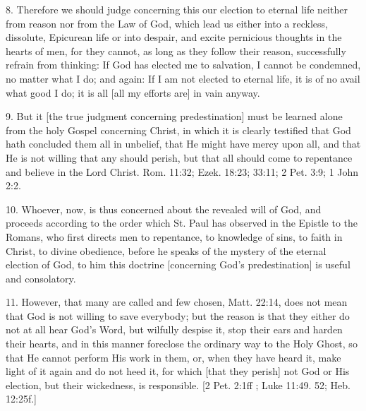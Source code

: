 8. Therefore we should judge concerning this our election to eternal life neither from reason nor from the Law of God, which lead us either into a reckless, dissolute, Epicurean life or into despair, and excite pernicious thoughts in the hearts of men, for they cannot, as long as they follow their reason, successfully refrain from thinking: If God has elected me to salvation, I cannot be condemned, no matter what I do; and again: If I am not elected to eternal life, it is of no avail what good I do; it is all [all my efforts are] in vain anyway.

9. But it [the true judgment concerning predestination] must be learned alone from the holy Gospel concerning Christ, in which it is clearly testified that God hath concluded them all in unbelief, that He might have mercy upon all, and that He is not willing that any should perish, but that all should come to repentance and believe in the Lord Christ. Rom. 11:32; Ezek. 18:23; 33:11; 2 Pet. 3:9; 1 John 2:2.

10. Whoever, now, is thus concerned about the revealed will of God, and proceeds according to the order which St. Paul has observed in the Epistle to the Romans, who first directs men to repentance, to knowledge of sins, to faith in Christ, to divine obedience, before he speaks of the mystery of the eternal election of God, to him this doctrine [concerning God's predestination] is useful and consolatory.

11. However, that many are called and few chosen, Matt. 22:14, does not mean that God is not willing to save everybody; but the reason is that they either do not at all hear God's Word, but wilfully despise it, stop their ears and harden their hearts, and in this manner foreclose the ordinary way to the Holy Ghost, so that He cannot perform His work in them, or, when they have heard it, make light of it again and do not heed it, for which [that they perish] not God or His election, but their wickedness, is responsible. [2 Pet. 2:1ff ; Luke 11:49. 52; Heb. 12:25f.]

